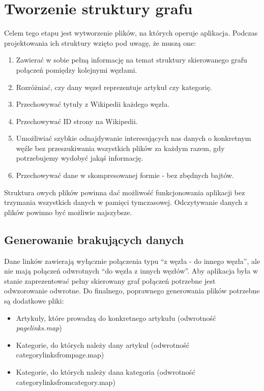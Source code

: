 \section{Tworzenie struktury grafu}
\label{sec:data-files}
Celem tego etapu jest wytworzenie plików, na których operuje aplikacja. Podczas projektowania ich struktury wzięto pod uwagę, że muszą one:
\begin{enumerate}
    \item Zawierać w sobie pełną informację na temat struktury skierowanego grafu połączeń pomiędzy kolejnymi węzłami.
    \item Rozróżniać, czy dany węzeł reprezentuje artykuł czy kategorię.
    \item Przechowywać tytuły z Wikipedii każdego węzła.
    \item Przechowywać ID strony na Wikipedii.
    \item Umożliwiać szybkie odnajdywanie interesujących nas danych o konkretnym węźle bez przeszukiwania wszystkich plików za każdym razem, gdy potrzebujemy wydobyć jakąś informację.
    \item Przechowywać dane w skompresowanej formie - bez zbędnych bajtów.
\end{enumerate}

Struktura owych plików powinna dać możliwość funkcjonowania aplikacji bez trzymania wszystkich danych w pamięci tymczasowej. Odczytywanie danych z plików powinno być możliwie najszybsze.

\subsection{Generowanie brakujących danych}
\label{sec:generating-missing-files}

Dane linków zawierają wyłącznie połączenia typu ``z węzła - do innego węzła'', ale nie mają połączeń odwrotnych ``do węzła z innych węzłów''. Aby aplikacja była w stanie zaprezentować pełny skierowany graf połączeń potrzebne jest odwzorowanie odwrotne.
Do finalnego, poprawnego generowania plików potrzebne są dodatkowe pliki:
\begin{itemize}
    \item Artykuły, które prowadzą do konkretnego artykułu (odwrotność \textit{pagelinks.map})
    \item Kategorie, do których należy dany artykuł (odwrotność categorylinksfrompage.map)
    \item Kategorie, do których należy dana kategoria (odwrotność categorylinksfromcategory.map)
\end{itemize}

